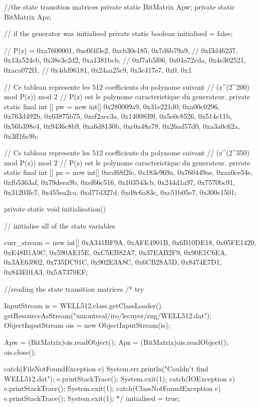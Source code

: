 \begin{code}
\begin{hide}
{   //the state transition matrices
   private static BitMatrix Apw;
   private static BitMatrix Apz;

   // if the generator was initialised
   private static boolean initialised = false;

   // P(z) = {0xa7600001, 0xe0f4f3e2, 0xcb30e185, 0x7d6b79a9,
   //         0xf3d46237, 0x13a524cb, 0x38e3c2d2, 0xa1381bcb,
   //         0xf7ab5f06, 0x04a72cda, 0x4e302521, 0xaca072f1,
   //         0x4dd96181, 0x24aa25c9, 0x3c417e7,  0x0, 0x1}

   // Ce tableau represente les 512 coefficients du polynome suivant
   // (z^(2^200) mod P(z)) mod 2
   // P(z) est le polynome caracteristique du generateur.
   private static final int [] pw = new int[]
                          {0x280009a9, 0x31e221d0, 0xa00c0296, 0x763d492b,
                           0x63875b75, 0xef2acc3a, 0x1400839f, 0x5e0c8526,
                            0x514e11b, 0x56b398e4, 0x9436c8b9, 0xa6d8130b,
                           0xc0a48a78, 0x26ad57d0, 0xa3a0c62a, 0x3ff16c9b};

   // Ce tableau represente les 512 coefficients du polynome suivant
   // (z^(2^350) mod P(z)) mod 2
   // P(z) est le polynome caracteristique du generateur.
   private static final int [] pz = new int[]
                          {0xcd68f2fe, 0x183e969a, 0x760449ae, 0xaa0ce54e,
                           0xfb5363af, 0x79deea9b, 0xef66c516, 0x103543cb,
                           0x244d1a97, 0x7570bc91, 0x31203fc7, 0x455ea2ca,
                           0xd77d327d, 0xd8c6a83c, 0xc51b05e7, 0x300c1501};

   private static void initialisation() {
      // initialise all of the state variables

      curr_stream = new int[] {0xA341BF9A, 0xAFE4901B, 0x6B10DE18, 0x05FE1420,
                               0xE48B1A9C, 0x590AE15E, 0xC5EB82A7, 0x37EAB2F9,
                               0x90E1C6EA, 0x3AE63902, 0x735DC91C, 0x902E3A8C,
                               0x6CB28A5D, 0x8474E7D1, 0x843E01A3, 0x5A7370EF};

      //reading the state transition matrices
/*
      try {
         InputStream is = WELL512.class.getClassLoader().
               getResourceAsStream("umontreal/iro/lecuyer/rng/WELL512.dat");
         ObjectInputStream ois = new ObjectInputStream(is);

         Apw = (BitMatrix)ois.readObject();
         Apz = (BitMatrix)ois.readObject();
         ois.close();

      } catch(FileNotFoundException e) {
         System.err.println("Couldn't find WELL512.dat");
         e.printStackTrace();
         System.exit(1);
      } catch(IOException e) {
         e.printStackTrace();
         System.exit(1);
      } catch(ClassNotFoundException e) {
         e.printStackTrace();
         System.exit(1);
      }
*/
      initialised = true;
   }

}
\end{hide}
\end{code}
